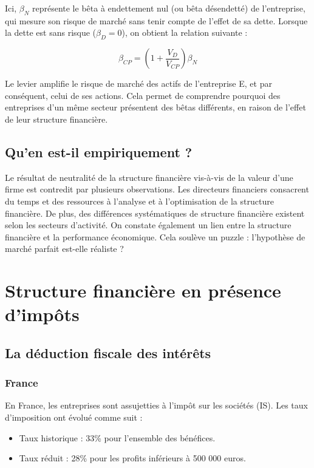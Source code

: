 \documentclass[a4paper, 12pt]{report}
\begin{document}
Ici, \( \beta_N \) représente le bêta à endettement nul (ou bêta désendetté) de l'entreprise, qui mesure son risque de marché sans tenir compte de l'effet de sa dette. Lorsque la dette est sans risque (\( \beta_D = 0 \)), on obtient la relation suivante :

\[
\beta_{CP} = \left(1 + \frac{V_D}{V_{CP}}\right) \beta_N
\]

Le levier amplifie le risque de marché des actifs de l'entreprise E, et par conséquent, celui de ses actions. Cela permet de comprendre pourquoi des entreprises d'un même secteur présentent des bêtas différents, en raison de l'effet de leur structure financière.

\section{Qu'en est-il empiriquement ?}

Le résultat de neutralité de la structure financière vis-à-vis de la valeur d’une firme est contredit par plusieurs observations. Les directeurs financiers consacrent du temps et des ressources à l'analyse et à l'optimisation de la structure financière. De plus, des différences systématiques de structure financière existent selon les secteurs d'activité. On constate également un lien entre la structure financière et la performance économique. Cela soulève un puzzle : l'hypothèse de marché parfait est-elle réaliste ?

\chapter{Structure financière en présence d'impôts}

\section{La déduction fiscale des intérêts}

\subsection{France}

En France, les entreprises sont assujetties à l'impôt sur les sociétés (IS). Les taux d'imposition ont évolué comme suit :
\begin{itemize}
	\item Taux historique : 33\% pour l'ensemble des bénéfices.
	\item Taux réduit : 28\% pour les profits inférieurs à 500 000 euros.
\end{itemize}
\end{document}
